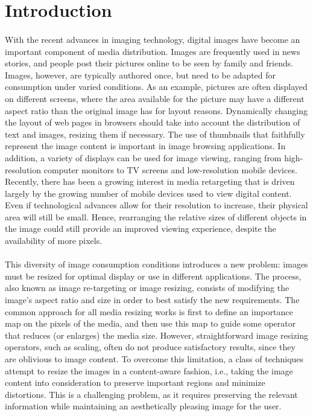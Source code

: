 \documentclass[conference]{acmsiggraph}
\begin{document}

\copyrightspace

\section{Introduction}

\paragraph{}
With the recent advances in imaging technology, digital images have become an important component of media distribution. Images are frequently used in news stories, and people post their pictures online to be seen by family and friends. Images, however, are typically authored once, but need to be adapted for consumption under varied conditions. As an example, pictures are often displayed on different screens, where the area available for the picture may have a different aspect ratio than the original image has for layout reasons. Dynamically changing the layout of web pages in browsers should take into account the distribution of text and images, resizing them if necessary. The use of thumbnails that faithfully represent the image content is important in image browsing applications. In addition, a variety of displays can be used for image viewing, ranging from high-resolution computer monitors to TV screens and low-resolution mobile devices. Recently, there has been a growing interest in media retargeting that is driven largely by the growing number of mobile devices used to view digital content. Even if technological advances allow for their resolution to increase, their physical area will still be small. Hence, rearranging the relative sizes of different objects in the image could still provide an improved viewing experience, despite the availability of more pixels.

\paragraph{}
This diversity of image consumption conditions introduces a new problem: images must be resized for optimal display or use in different applications. The process, also known as image re-targeting or image resizing, consists of modifying the image's aspect ratio and size in order to best satisfy the new requirements.  The common approach for all media resizing works is first to define an importance map on the pixels of the media, and then use this map to guide some operator that reduces (or enlarges) the media size. However, straightforward image resizing operators, such as scaling, often do not produce satisfactory results, since they are oblivious to image content. To overcome this limitation, a class of techniques attempt to resize the images in a content-aware fashion, i.e., taking the image content into consideration to preserve important regions and minimize distortions. This is a challenging problem, as it requires preserving the relevant information while maintaining an aesthetically pleasing image for the user.
\end{document}
